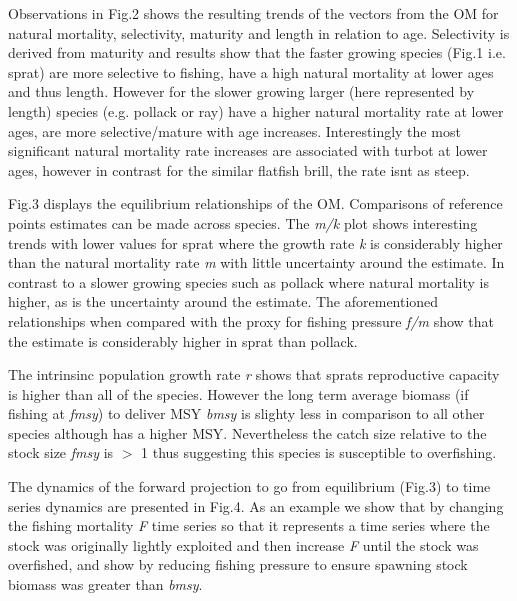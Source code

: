 \documentclass[preprint,review,12pt]{elsarticle}
\begin{document}
Observations in Fig.2 shows the resulting trends of the vectors from the OM for natural mortality, selectivity, maturity and length in relation to age. Selectivity is derived from maturity and results show that the faster growing species (Fig.1 i.e. sprat) are more selective to fishing, have a high natural mortality at lower ages and thus length.  However for the slower growing larger (here represented by length) species (e.g. pollack or ray) have a higher natural mortality rate at lower ages, are more selective/mature with age increases. Interestingly the most significant natural mortality rate increases are associated with turbot at lower ages, however in contrast for the similar flatfish brill, the rate isnt as steep. 

Fig.3 displays the equilibrium relationships of the OM. Comparisons of reference points estimates can be made across species.  The \textit{m/k} plot shows interesting trends with lower values for sprat where the growth rate \textit{k} is considerably higher than the natural mortality rate \textit{m} with little uncertainty around the estimate. In contrast to a slower growing species such as pollack where natural mortality is higher, as is the uncertainty around the estimate. The aforementioned relationships when compared with the proxy for fishing pressure \textit{f/m} show that the estimate is considerably higher in sprat than pollack. 

The intrinsinc population growth rate \textit{r} shows that sprats reproductive capacity is higher than all of the species. However the long term average biomass (if fishing at \textit{fmsy}) to deliver MSY \textit{bmsy} is slighty less in comparison to all other species although has a higher MSY. Nevertheless the catch size relative to the stock size \textit{fmsy} is $>$ 1 thus suggesting this species is susceptible to overfishing. 

The dynamics of the forward projection to go from equilibrium (Fig.3) to time series dynamics are presented in Fig.4. As an example we show that by changing the fishing mortality \textit{F} time series so that it represents a time series where the stock was originally lightly exploited and then increase \textit{F} until the stock was overfished, and show by reducing fishing pressure to ensure spawning stock biomass was greater than \textit{bmsy}.
\end{document}
